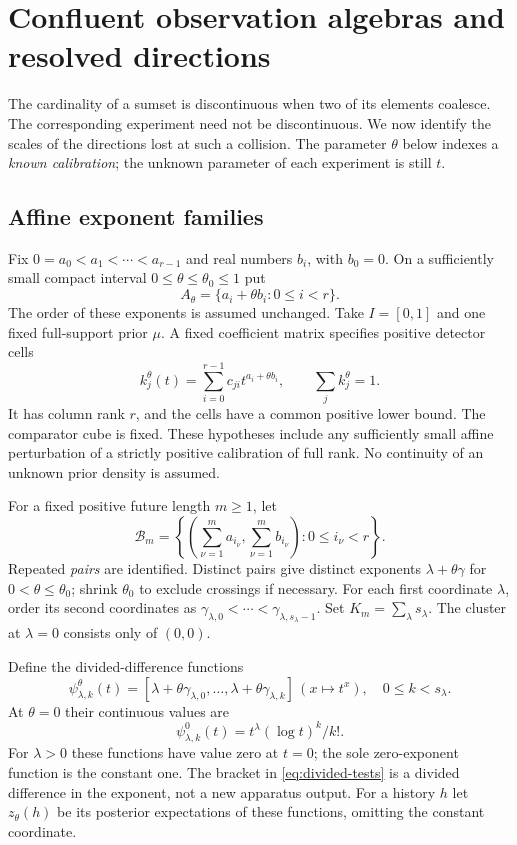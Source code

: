 \section{Confluent observation algebras and resolved directions}\label{sec:confluence}
The cardinality of a sumset is discontinuous when two of its elements
coalesce. The corresponding experiment need not be discontinuous. We now
identify the scales of the directions lost at such a collision. The
parameter $\theta$ below indexes a \emph{known calibration}; the unknown
parameter of each experiment is still $t$.

\subsection{Affine exponent families}
Fix $0=a_0<a_1<\cdots<a_{r-1}$ and real numbers $b_i$, with $b_0=0$.
On a sufficiently small compact interval $0\le\theta\le\theta_0\le1$ put
\[
 A_\theta=\{a_i+\theta b_i:0\le i<r\}.
\]
The order of these exponents is assumed unchanged. Take $I=[0,1]$ and
one fixed full-support prior $\mu$. A fixed coefficient matrix specifies
positive detector cells
\begin{equation}\label{eq:affine-calibration}
 k_j^\theta(t)=\sum_{i=0}^{r-1}c_{ji}t^{a_i+\theta b_i},
 \qquad \sum_jk_j^\theta=1.
\end{equation}
It has column rank $r$, and the cells have a common positive lower bound.
The comparator cube is fixed. These hypotheses include any sufficiently
small affine perturbation of a strictly positive calibration of full rank.
No continuity of an unknown prior density is assumed.

For a fixed positive future length $m\ge1$, let
\[
 \mathcal B_m=\left\{\left(\sum_{\nu=1}^m a_{i_\nu},
                              \sum_{\nu=1}^m b_{i_\nu}\right):
                              0\le i_\nu<r\right\}.
\]
Repeated \emph{pairs} are identified. Distinct pairs give distinct
exponents $\lambda+\theta\gamma$ for $0<\theta\le\theta_0$; shrink
$\theta_0$ to exclude crossings if necessary. For each first coordinate
$\lambda$, order its second coordinates as
$\gamma_{\lambda,0}<\cdots<\gamma_{\lambda,s_\lambda-1}$.
Set $K_m=\sum_\lambda s_\lambda$. The cluster at $\lambda=0$ consists
only of $(0,0)$.

Define the divided-difference functions
\begin{equation}\label{eq:divided-tests}
 \psi_{\lambda,k}^\theta(t)
  =[\lambda+\theta\gamma_{\lambda,0},\ldots,
       \lambda+\theta\gamma_{\lambda,k}]\,(x\mapsto t^x),
 \quad 0\le k<s_\lambda.
\end{equation}
At $\theta=0$ their continuous values are
\begin{equation}\label{eq:jet-tests}
 \psi_{\lambda,k}^0(t)=t^\lambda(\log t)^k/k!.
\end{equation}
For $\lambda>0$ these functions have value zero at $t=0$; the sole
zero-exponent function is the constant one. The bracket in
\eqref{eq:divided-tests} is a divided difference in the exponent, not a
new apparatus output. For a history $h$ let $z_\theta(h)$ be its posterior
expectations of these functions, omitting the constant coordinate.

